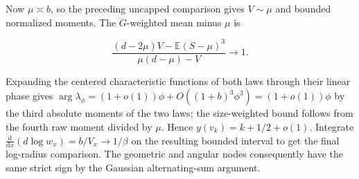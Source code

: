 Now $\mu\asymp b$, so the preceding uncapped comparison gives $V\sim\mu$ and bounded normalized moments. The $G$-weighted mean minus $\mu$ is

\begin{equation*}
\frac{(d-2\mu)V-\mathbb E(S-\mu)^3}{\mu(d-\mu)-V}\longrightarrow1 .
\end{equation*}

Expanding the centered characteristic functions of both laws through their linear phase gives $\arg\lambda_\phi=(1+o(1))\phi+O((1+b)^3\phi^3)=(1+o(1))\phi$ by the third absolute moments of the two laws; the size-weighted bound follows from the fourth raw moment divided by $\mu$. Hence $y(v_k)=k+1/2+o(1)$. Integrate $\frac{\mathrm d}{\mathrm dx}(d\log w_x)=b/V_x\to1/\beta$ on the resulting bounded interval to get the final log-radius comparison. The geometric and angular nodes consequently have the same strict sign by the Gaussian alternating-sum argument.
